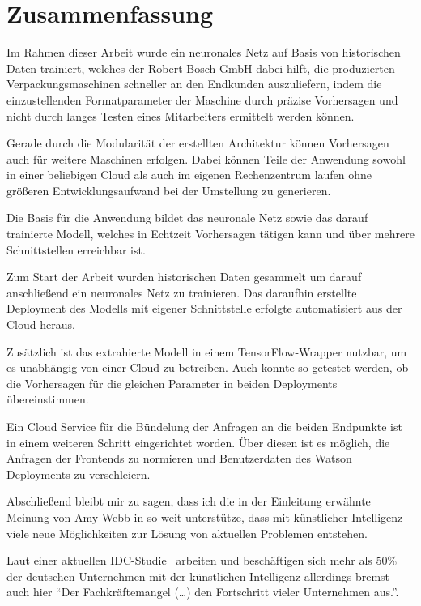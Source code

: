 \chapter{Zusammenfassung}
\label{ch:zusammenfassung}
Im Rahmen dieser Arbeit wurde ein neuronales Netz auf Basis von historischen Daten trainiert, welches der Robert Bosch
GmbH dabei hilft, die produzierten Verpackungsmaschinen schneller an den Endkunden auszuliefern, indem die
einzustellenden Formatparameter der Maschine durch präzise Vorhersagen und nicht durch langes Testen eines Mitarbeiters
ermittelt werden können.

Gerade durch die Modularität der erstellten Architektur können Vorhersagen auch für weitere Maschinen erfolgen. Dabei
können Teile der Anwendung sowohl in einer beliebigen Cloud als auch im eigenen Rechenzentrum laufen ohne größeren
Entwicklungsaufwand bei der Umstellung zu generieren.

Die Basis für die Anwendung bildet das neuronale Netz sowie das darauf trainierte Modell, welches in Echtzeit
Vorhersagen tätigen kann und über mehrere Schnittstellen erreichbar ist.

Zum Start der Arbeit wurden historischen Daten gesammelt um darauf anschließend ein neuronales Netz zu trainieren. Das
daraufhin erstellte Deployment des Modells mit eigener Schnittstelle erfolgte automatisiert aus der Cloud heraus.

Zusätzlich ist das extrahierte Modell in einem TensorFlow-Wrapper nutzbar, um es unabhängig von einer Cloud zu
betreiben. Auch konnte so getestet werden, ob die Vorhersagen für die gleichen Parameter in beiden Deployments
übereinstimmen.

Ein Cloud Service für die Bündelung der Anfragen an die beiden Endpunkte ist in einem weiteren Schritt eingerichtet
worden. Über diesen ist es möglich, die Anfragen der Frontends zu normieren und Benutzerdaten des Watson Deployments zu
verschleiern.

Abschließend bleibt mir zu sagen, dass ich die in der Einleitung erwähnte Meinung von Amy Webb in so weit unterstütze,
dass mit künstlicher Intelligenz viele neue Möglichkeiten zur Lösung von aktuellen Problemen entstehen.

Laut einer aktuellen IDC-Studie~\cite{article_zusammenfassung_idc} arbeiten und beschäftigen sich mehr als 50\% der
deutschen Unternehmen mit der künstlichen Intelligenz allerdings bremst auch hier \enquote{Der Fachkräftemangel (\ldots)
den Fortschritt vieler Unternehmen aus.}.